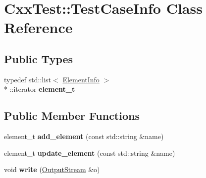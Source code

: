 \hypertarget{classCxxTest_1_1TestCaseInfo}{\section{Cxx\-Test\-:\-:Test\-Case\-Info Class Reference}
\label{classCxxTest_1_1TestCaseInfo}
}
\subsection*{Public Types}
\begin{DoxyCompactItemize}
\item 
\hypertarget{classCxxTest_1_1TestCaseInfo_a7f319092890025757eed524cf0b65e6d}{typedef std\-::list$<$ \hyperlink{classCxxTest_1_1ElementInfo}{Element\-Info} $>$\\*
\-::iterator {\bfseries element\-\_\-t}}\label{classCxxTest_1_1TestCaseInfo_a7f319092890025757eed524cf0b65e6d}

\end{DoxyCompactItemize}
\subsection*{Public Member Functions}
\begin{DoxyCompactItemize}
\item 
\hypertarget{classCxxTest_1_1TestCaseInfo_ae47ffa914a3306393510a8239081168f}{element\-\_\-t {\bfseries add\-\_\-element} (const std\-::string \&name)}\label{classCxxTest_1_1TestCaseInfo_ae47ffa914a3306393510a8239081168f}

\item 
\hypertarget{classCxxTest_1_1TestCaseInfo_a3f479b5bc231aa0e20788e8c00f8e84e}{element\-\_\-t {\bfseries update\-\_\-element} (const std\-::string \&name)}\label{classCxxTest_1_1TestCaseInfo_a3f479b5bc231aa0e20788e8c00f8e84e}

\item 
\hypertarget{classCxxTest_1_1TestCaseInfo_ac4fd88b62c9900dad89b5beb6fc21e0f}{void {\bfseries write} (\hyperlink{classCxxTest_1_1OutputStream}{Output\-Stream} \&o)}\label{classCxxTest_1_1TestCaseInfo_ac4fd88b62c9900dad89b5beb6fc21e0f}

\end{DoxyCompactItemize}
